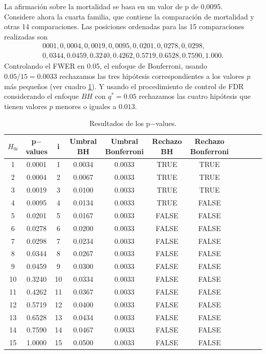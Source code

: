 \documentclass[11pt,letterpaper]{article}
\begin{document}
La afirmación sobre la mortalidad se basa en un valor de p de 0,0095.\\ Considere ahora la cuarta familia, que contiene la comparación de mortalidad y otras 14 comparaciones. Las posiciones ordenadas para las 15 comparaciones realizadas son \begin{align*}
0001, 0,0004, 0,0019, 0,0095, 0,0201, 0,0278, 0,0298,\\ 0,0344, 0.0459, 0.3240, 0.4262, 0.5719, 0.6528, 0.7590, 1.000.
\end{align*}
Controlando el FWER en 0.05, el enfoque de Bonferroni, usando $0.05 / 15 = 0.0033$ rechazamos las tres hipótesis correspondientes a los valores $p$ más pequeños (ver cuadro \ref{t_p_ejecicio}). Y usando el procedimiento de control de FDR considerando el enfoque $BH$ con $q^* = 0.05$ rechazamos las cuatro hipótesis que tienen valores $p$ menores o iguales a $0.013$.

\begin{table}[H] \label{t_p_ejecicio}
\begin{tabular}{ccccccccccc}
\hline
\hline
$H_{0i}$ & p$-$values & i &  Umbral BH & Umbral Bonferroni & Rechazo BH& Rechazo Bonferroni\\
\hline
\hline
1 &   0.0001&  1& 0.0034&       0.0033&       TRUE&               TRUE\\
2 &   0.0004&  2& 0.0067&       0.0033&       TRUE&               TRUE\\
3 &   0.0019&  3& 0.0100&       0.0033&       TRUE&               TRUE\\
4 &   0.0095&  4& 0.0134&       0.0033&       TRUE&              FALSE\\
5 &   0.0201&  5& 0.0167&       0.0033&      FALSE&              FALSE\\
6 &   0.0278&  6& 0.0200&       0.0033&      FALSE&              FALSE\\
7 &   0.0298&  7& 0.0234&       0.0033&      FALSE&              FALSE\\
8 &   0.0344&  8& 0.0267&       0.0033&      FALSE&              FALSE\\
9 &   0.0459&  9& 0.0300&       0.0033&      FALSE&              FALSE\\
10&   0.3240& 10& 0.0334&       0.0033&      FALSE&              FALSE\\
11&   0.4262& 11& 0.0367&       0.0033&      FALSE&              FALSE\\
12&   0.5719& 12& 0.0400&       0.0033&      FALSE&              FALSE\\
13&   0.6528& 13& 0.0434&       0.0033&      FALSE&              FALSE\\
14&   0.7590& 14& 0.0467&       0.0033&      FALSE&              FALSE\\
15&   1.0000& 15& 0.0500&       0.0033&      FALSE&              FALSE\\
\hline
\hline
\end{tabular}
\caption{Resultados de los p$-$values.}
\end{table}
\end{document}
